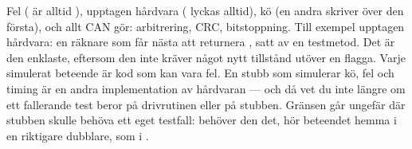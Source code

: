  Fel ( är alltid ), upptagen hårdvara ( lyckas
alltid), kö (en andra  skriver över den första), och allt CAN gör: arbitrering, CRC,
bitstoppning.
 Till exempel upptagen hårdvara: en räknare som får nästa  att returnera
, satt av en testmetod. Det är den enklaste, eftersom den inte kräver något nytt
tillstånd utöver en flagga.
 Varje simulerat beteende är kod som kan vara fel. En stubb som simulerar kö, fel och
timing är en andra implementation av hårdvaran --- och då vet du inte längre om ett fallerande test
beror på drivrutinen eller på stubben. Gränsen går ungefär där stubben skulle behöva ett eget
testfall: behöver den det, hör beteendet hemma i en riktigare dubblare, som
 i .
